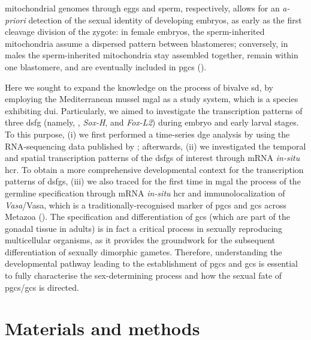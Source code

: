 mitochondrial genomes through eggs and sperm, respectively, allows for an \textit{a-priori} detection of the sexual identity of developing embryos, as early as the first cleavage division of the zygote: in female embryos, the sperm-inherited mitochondria assume a dispersed pattern between blastomeres; conversely, in males the sperm-inherited mitochondria stay assembled together, remain within one blastomere, and are eventually included in \glspl{pgc} ().

Here we sought to expand the knowledge on the process of bivalve \gls{sd}, by employing the Mediterranean mussel \gls{mgal} as a study system, which is a species exhibiting \gls{dui}. Particularly, we aimed to investigate the transcription patterns of three \gls{dsfg} (namely, , \textit{Sox-H}, and \textit{Fox-L2}) during embryo and early larval stages. To this purpose, (i) we first performed a time-series \gls{dge} analysis by using the RNA-sequencing data published by ; afterwards, (ii) we investigated the temporal and spatial transcription patterns of the \glspl{dsfg} of interest through mRNA \textit{in-situ} \gls{hcr}. To obtain a more comprehensive developmental context for the transcription patterns of \glspl{dsfg}, (iii) we also traced for the first time in \gls{mgal} the process of the germline specification through mRNA \textit{in-situ} \gls{hcr} and immunolocalization of \textit{Vasa}/Vasa, which is a traditionally-recognised marker of \glspl{pgc} and \glspl{gc} across Metazoa (). The specification and differentiation of \glspl{gc} (which are part of the gonadal tissue in adults) is in fact a critical process in sexually reproducing multicellular organisms, as it provides the groundwork for the subsequent differentiation of sexually dimorphic gametes. Therefore, understanding the developmental pathway leading to the establishment of \glspl{pgc} and \glspl{gc} is essential to fully characterise the sex-determining process and how the sexual fate of \glspl{pgc}/\glspl{gc} is directed.

\section{Materials and methods} \label{chapter:insitu-MM}
